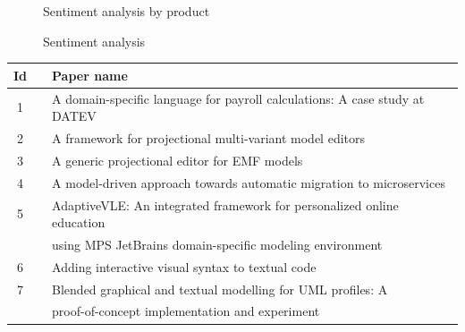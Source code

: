 \begin{figure}[h]
    \centering
    \caption{Sentiment analysis by product}
    \label{fig:sentiment_analysis2}
\end{figure}

\begin{figure}[htbp]
    \centering
    \caption{Sentiment analysis}
    \label{fig:sentiment_analysis}
\end{figure}


\begin{table}[htbp]
    \begin{center}
        \begin{tabular}{ |c  c|l | } 
            \hline
            Id  &                                        & Paper name                                                                  \\
            \hline
            1   &  \cite{voelterdomain_SLR}              & A domain-specific language for payroll calculations: A case study at DATEV  \\ \hline
            2   &  \cite{schropfer2021framework_SLR}     & A framework for projectional multi-variant model editors                    \\ \hline
            3   &  \cite{schropfer2020generic_SLR}       & A generic projectional editor for EMF models                                \\ \hline
            4   &  \cite{bucchiarone2019model_SLR}       & A model-driven approach towards automatic migration to microservices        \\ \hline
            5   &  \cite{meacham2020adaptivevle_SLR}     & AdaptiveVLE: An integrated framework for personalized online education      \\
                &                                        & using MPS JetBrains domain-specific modeling environment                    \\ \hline
            6   &  \cite{andersen2020adding_SLR}         & Adding interactive visual syntax to textual code                            \\ \hline
            7   &  \cite{addazi2021blended_SLR}          & Blended graphical and textual modelling for UML profiles: A                 \\
                &                                        & proof-of-concept implementation and experiment                              \\ \hline

\end{tabular}
\end{center}
\end{table}
